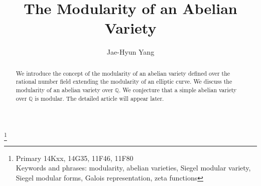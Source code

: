 \documentclass[11pt]{amsart}
\title{The Modularity of an Abelian Variety}
\renewcommand{\theequation}{\thesection.\arabic{equation}}
\renewcommand{\thetheorem}{\thesection.\arabic{theorem}}
\begin{document}
\author{Jae-Hyun Yang}


\address{Yang Institute for Advanced Study
\newline\indent
Seoul 07989, Korea
\vskip 2mm
and
\vskip 2mm
Department of Mathematics
\newline\indent
Inha University
\newline\indent
Incheon 22212, Korea}








\renewcommand{\theequation}{\thesection.\arabic{equation}}
\renewcommand{\thetheorem}{\thesection.\arabic{theorem}}
\renewcommand{\thelemma}{\thesection.\arabic{lemma}}
\newcommand{\BR}{\mathbb R}
\newcommand{\BQ}{\mathbb Q}
\newcommand{\BF}{\mathbb F}
\newcommand{\BT}{\mathbb T}
\newcommand{\BM}{\mathbb M}
\newcommand{\bn}{\bf n}
\def\charf {\mbox{{\text 1}\kern-.24em {\text l}}}
\newcommand{\BC}{\mathbb C}
\newcommand{\BZ}{\mathbb Z}

\thanks{ Primary 14Kxx, 14G35, 11F46, 11F80\\
\indent Keywords and phrases: modularity, abelian varieties, Siegel modular variety, Siegel modular forms,
Galois
\newline \indent
representation, zeta functions}






\begin{abstract}
We introduce the concept of the modularity of an abelian variety defined over the rational number field
extending the modularity of an elliptic curve. We discuss the modularity of an abelian variety over $\BQ$. We conjecture that a simple abelian variety over $\BQ$ is modular. The detailed article will appear later.
\end{abstract}



\maketitle
\end{document}
